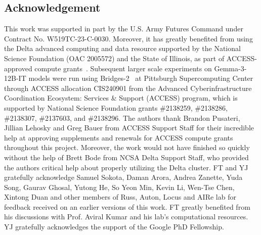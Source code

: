 \documentclass{article}
\theoremstyle{plain}
\theoremstyle{definition}
\theoremstyle{remark}
\begin{document}
\subsection*{Acknowledgement}
This work was supported in part by the U.S. Army Futures Command under Contract No. W519TC-23-C-0030. Moreover, it has greatly benefited from using the Delta advanced computing and data resource supported by the National Science Foundation (OAC 2005572) and the State of Illinois, as part of ACCESS-approved compute grants~\citep{access_compute}. Subsequent larger scale experiments on Gemma-3-12B-IT models were run using Bridges-2~\citep{psc_computing} at Pittsburgh Supercomputing Center through ACCESS  allocation CIS240901 from the Advanced Cyberinfrastructure Coordination Ecosystem: Services \& Support (ACCESS) program, which is supported by National Science Foundation grants \#2138259, \#2138286, \#2138307, \#2137603, and \#2138296. The authors thank Brandon Pusateri, Jillian Lehosky and Greg Bauer from ACCESS Support Staff for their incredible help at approving supplements and renewals for ACCESS compute grants throughout this project. Moreover, the work would not have finished so quickly without the help of Brett Bode from NCSA Delta Support Staff, who provided the authors critical help about properly utilizing the Delta cluster.  FT and YJ gratefully acknowledge Samuel Sokota, Daman Arora, Andrea Zanette, Yuda Song, Gaurav Ghosal, Yutong He, So Yeon Min, Kevin Li, Wen-Tse Chen, Xintong Duan and other members of Russ, Auton, Locus and AIRe lab for feedback received on an earlier versions of this work. FT greatly benefited from his discussions with Prof. Aviral Kumar and his lab's computational resources. YJ gratefully acknowledges the support of the Google PhD Fellowship.


\newpage
\appendix
\onecolumn
\end{document}
